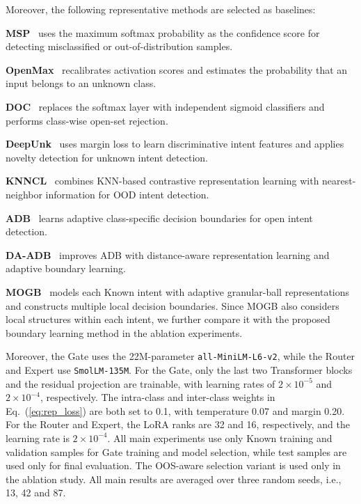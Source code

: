 \documentclass[11pt]{article}
\begin{document}
Moreover, the following representative methods are selected as baselines:

\textbf{MSP}~\citep{hendrycks2017baseline} uses the maximum softmax probability as the confidence score for detecting misclassified or out-of-distribution samples.

\textbf{OpenMax}~\citep{bendale2016towards} recalibrates activation scores and estimates the probability that an input belongs to an unknown class.

\textbf{DOC}~\citep{shu2017doc} replaces the softmax layer with independent sigmoid classifiers and performs class-wise open-set rejection.

\textbf{DeepUnk}~\citep{lin2019deep} uses margin loss to learn discriminative intent features and applies novelty detection for unknown intent detection.

\textbf{KNNCL}~\citep{zhou2022knn} combines KNN-based contrastive representation learning with nearest-neighbor information for OOD intent detection.

\textbf{ADB}~\citep{zhang2021adaptive} learns adaptive class-specific decision boundaries for open intent detection.

\textbf{DA-ADB}~\citep{zhang2023learning} improves ADB with distance-aware representation learning and adaptive boundary learning.

\textbf{MOGB}~\citep{li2025multi} models each Known intent with adaptive granular-ball representations and constructs multiple local decision boundaries. Since MOGB also considers local structures within each intent, we further compare it with the proposed boundary learning method in the ablation experiments.

Moreover, the Gate uses the 22M-parameter \texttt{all-MiniLM-L6-v2}, while the Router and Expert use \texttt{SmolLM-135M}. For the Gate, only the last two Transformer blocks and the residual projection are trainable, with learning rates of $2\times10^{-5}$ and $2\times10^{-4}$, respectively. The intra-class and inter-class weights in Eq.~(\ref{eq:rep_loss}) are both set to 0.1, with temperature 0.07 and margin 0.20. For the Router and Expert, the LoRA ranks are 32 and 16, respectively, and the learning rate is $2\times10^{-4}$. All main experiments use only Known training and validation samples for Gate training and model selection, while test samples are used only for final evaluation. The OOS-aware selection variant is used only in the ablation study. All main results are averaged over three random seeds, i.e., 13, 42 and 87.
\end{document}
